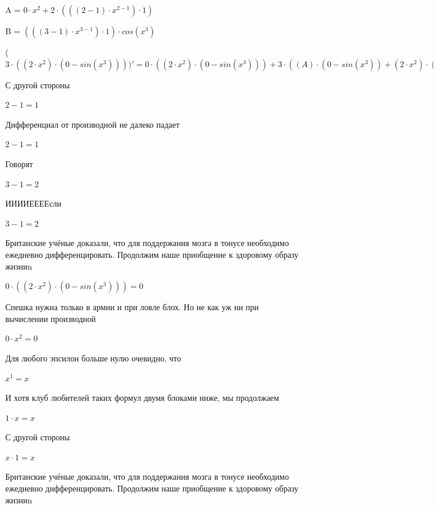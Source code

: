 \documentclass[12pt,a4paper,fleqn]{article}
\begin{document}
\begin{center}
A = $0 \cdot x^{2}+2 \cdot (((2-1) \cdot x^{2-1}) \cdot 1)$\end{center}
\begin{center}
B = $(((3-1) \cdot x^{3-1}) \cdot 1) \cdot cos(x^{3})$\end{center}
\begin{center}
 ($3 \cdot ((2 \cdot x^{2}) \cdot (0-sin(x^{3}))))'
  = 0 \cdot ((2 \cdot x^{2}) \cdot (0-sin(x^{3})))+3 \cdot ((A) \cdot (0-sin(x^{3}))+(2 \cdot x^{2}) \cdot (0-B))$\end{center}
С другой стороны

\begin{center}$2-1 = 1$\end{center}
Дифференциал от производной не далеко падает\cite{link2}

\begin{center}$2-1 = 1$\end{center}
Говорят

\begin{center}$3-1 = 2$\end{center}
ИИИИЕЕЕЕсли\cite{link3}

\begin{center}$3-1 = 2$\end{center}
Британские учёные доказали, что для поддержания мозга в тонусе необходимо ежедневно дифференцировать. Продолжим наше приобщение к здоровому образу жизниn

\begin{center}
$0 \cdot ((2 \cdot x^{2}) \cdot (0-sin(x^{3}))) = 0$\end{center}
Спешка нужна только в армии и при ловле блох. Но не как уж ни при вычислении производной\cite{link2}

\begin{center}
$0 \cdot x^{2} = 0$\end{center}
Для любого эпсилон больше нулю очевидно, что

\begin{center}
$x^{1} = x$\end{center}
И хотя клуб любителей таких формул двумя блоками ниже, мы продолжаем

\begin{center}
$1 \cdot x = x$\end{center}
С другой стороны

\begin{center}
$x \cdot 1 = x$\end{center}
Британские учёные доказали, что для поддержания мозга в тонусе необходимо ежедневно дифференцировать. Продолжим наше приобщение к здоровому образу жизниn
\end{document}
